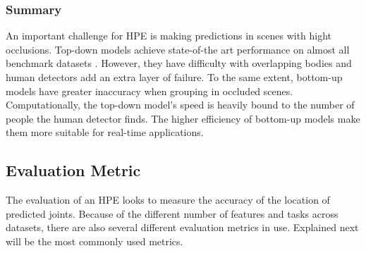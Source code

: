 \subsubsection{Summary}
An important challenge for HPE is making predictions in scenes with hight occlusions.
Top-down models achieve state-of-the art performance on almost all benchmark datasets \cite{Chen2000}.
However, they have difficulty with overlapping bodies and human detectors add an extra layer of failure.
To the same extent, bottom-up models have greater inaccuracy when grouping in occluded scenes.
Computationally, the top-down model's speed is heavily bound to the number of people the human detector finds.
The higher efficiency of bottom-up models make them more suitable for real-time applications.

\subsection{Evaluation Metric}
The evaluation of an HPE looks to measure the accuracy of the location of predicted joints.
Because of the different number of features and tasks across datasets, there are also several different evaluation metrics in use.
Explained next will be the most commonly used metrics.

